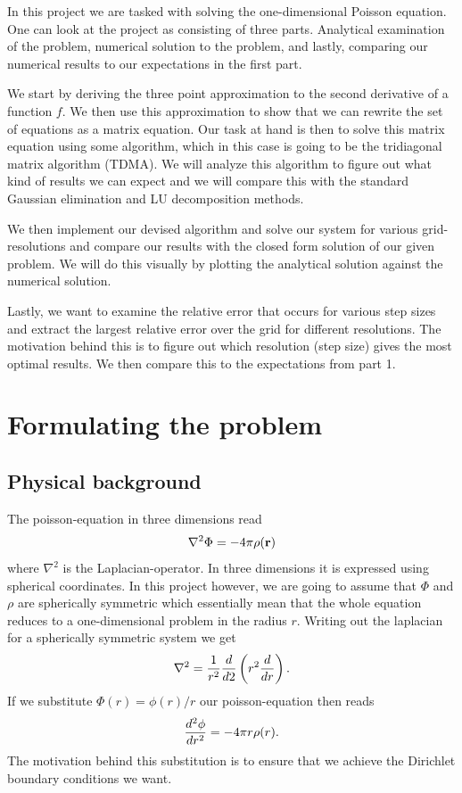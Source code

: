 \documentclass[10pt,a4paper]{amsart}
\begin{document}
  In this project we are tasked with solving the one-dimensional Poisson
  equation.  One can look at the project as consisting of three parts.
  Analytical examination of the problem, numerical solution to the problem, and
  lastly, comparing our numerical results to our expectations in the first part.
  
  We start by deriving the three point approximation to the second
  derivative of a function $f$.  We then use this approximation to show that we
  can rewrite the set of equations as a matrix equation. Our task at hand is
  then to solve this matrix equation using some algorithm, which in this case
  is going to be the tridiagonal matrix algorithm (TDMA). We will analyze this
  algorithm to figure out what kind of results we can expect and we will
  compare this with the standard Gaussian elimination and LU decomposition
  methods. 

  We then implement our devised algorithm and solve our system for various
  grid-resolutions and compare our results with the closed form solution of our
  given problem. We will do this visually by plotting the analytical solution
  against the numerical solution.

  Lastly, we want to examine the relative error that occurs for various step
  sizes and extract the largest relative error over the grid for different
  resolutions. The motivation behind this is to figure out which resolution
  (step size) gives the most optimal results.  We then compare this to the
  expectations from part 1.


  \section{Formulating the problem}
  \label{seq:formulating}
  
  \subsection{Physical background}
  \label{sub:physical_background}
  
  The poisson-equation in three dimensions read
  \begin{equation}
    \notag
    \nabla^2\Phi = -4\pi\rho(\mathbf r) 
  \end{equation}
  where $\nabla^2$ is the Laplacian-operator. In three dimensions it is
  expressed using spherical coordinates. In this project however, we are going
  to assume that $\Phi$ and $\rho$ are spherically symmetric which essentially
  mean that the whole equation reduces to a one-dimensional problem in the
  radius $r$. Writing out the laplacian for a spherically symmetric system we
  get
  \begin{equation}
    \notag
    \nabla^2 = \frac{1}{r^2}\frac{d}{d2}\left( r^2 \frac{d}{dr} \right).
  \end{equation}
  If we substitute $\Phi(r) = \phi(r)/r$ our poisson-equation then reads
  \begin{equation}
    \notag
    \frac{d^2\phi}{dr^2} = -4\pi r \rho(r).
  \end{equation}
  The motivation behind this substitution is to ensure that we achieve the
  Dirichlet boundary conditions we want.
\end{document}
